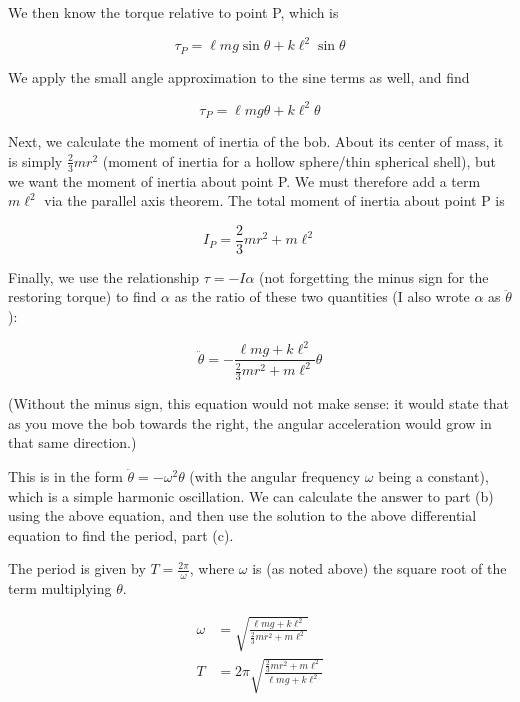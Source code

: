 \documentclass[8.01x]{subfiles}
\begin{document}
We then know the torque relative to point P, which is

\begin{equation}
\tau_P = \ell m g \sin \theta + k \ell^2 \sin \theta
\end{equation}

We apply the small angle approximation to the sine terms as well, and find

\begin{equation}
\tau_P = \ell m g \theta + k \ell^2 \theta
\end{equation}

Next, we calculate the moment of inertia of the bob. About its center of mass, it is simply $\frac{2}{3} m r^2$ (moment of inertia for a hollow sphere/thin spherical shell), but we want the moment of inertia about point P. We must therefore add a term $m \ell^2$ via the parallel axis theorem. The total moment of inertia about point P is

\begin{equation}
I_P = \frac{2}{3} m r^2 + m \ell^2
\end{equation}

Finally, we use the relationship $\tau = -I \alpha$ (not forgetting the minus sign for the restoring torque) to find $\alpha$ as the ratio of these two quantities (I also wrote $\alpha$ as $\ddot{\theta}$):

\begin{equation}
\ddot{\theta} = - \frac{\ell m g + k \ell^2}{\frac{2}{3} m r^2 + m \ell^2} \theta
\end{equation}

(Without the minus sign, this equation would not make sense: it would state that as you move the bob towards the right, the angular acceleration would grow in that same direction.)

This is in the form $\ddot{\theta} = -\omega^2 \theta$ (with the angular frequency $\omega$ being a constant), which is a simple harmonic oscillation. We can calculate the answer to part (b) using the above equation, and then use the solution to the above differential equation to find the period, part (c).

The period is given by $\displaystyle T = \frac{2\pi}{\omega}$, where $\omega$ is (as noted above) the square root of the term multiplying $\theta$.

\begin{align}
\omega &= \sqrt{\frac{\ell m g + k \ell^2}{\frac{2}{3} m r^2 + m \ell^2}}\\
T &= 2 \pi \sqrt{\frac{\frac{2}{3} m r^2 + m \ell^2}{\ell m g + k \ell^2}}
\end{align}
\end{document}
